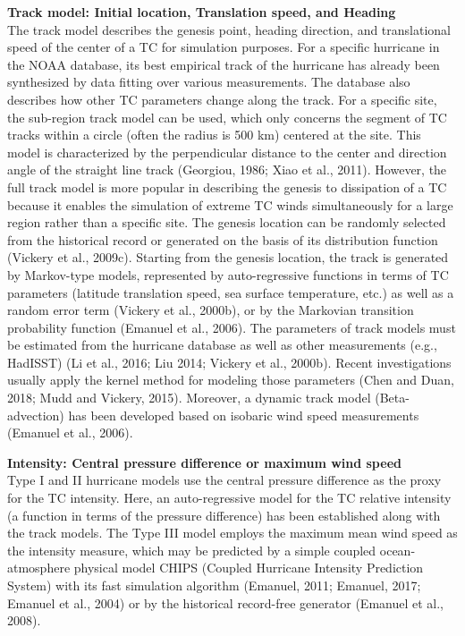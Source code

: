 \noindent\textbf{Track model: Initial location, Translation speed, and Heading} \\The track model describes the genesis point, heading direction, and translational speed of the center of a TC for simulation purposes. For a specific hurricane in the NOAA database, its best empirical track of the hurricane has already been synthesized by data fitting over various measurements. The database also describes how other TC parameters change along the track. For a specific site, the sub-region track model can be used, which only concerns the segment of TC tracks within a circle (often the radius is 500 km) centered at the site. This model is characterized by the perpendicular distance to the center and direction angle of the straight line track (Georgiou, 1986; Xiao et al., 2011). However, the full track model is more popular in describing the genesis to dissipation of a TC because it enables the simulation of extreme TC winds simultaneously for a large region rather than a specific site. The genesis location can be randomly selected from the historical record or generated on the basis of its distribution function (Vickery et al., 2009c). Starting from the genesis location, the track is generated by Markov-type models, represented by auto-regressive functions in terms of TC parameters (latitude translation speed, sea surface temperature, etc.) as well as a random error term (Vickery et al., 2000b), or by the Markovian transition probability function (Emanuel et al., 2006). The parameters of track models must be estimated from the hurricane database as well as other measurements (e.g., HadISST) (Li et al., 2016; Liu 2014; Vickery et al., 2000b). Recent investigations usually apply the kernel method for modeling those parameters (Chen and Duan, 2018; Mudd and Vickery, 2015). Moreover, a dynamic track model (Beta-advection) has been developed based on isobaric wind speed measurements (Emanuel et al., 2006). 
\newline

\noindent\textbf{Intensity: Central pressure difference or maximum wind speed} \\Type I and II hurricane models use the central pressure difference as the proxy for the TC intensity. Here, an auto-regressive model for the TC relative intensity (a function in terms of the pressure difference) has been established along with the track models. The Type III model employs the maximum mean wind speed as the intensity measure, which may be predicted by a simple coupled ocean-atmosphere physical model CHIPS (Coupled Hurricane Intensity Prediction System) with its fast simulation algorithm (Emanuel, 2011; Emanuel, 2017; Emanuel et al., 2004) or by the historical record-free generator (Emanuel et al., 2008). 
\newline

